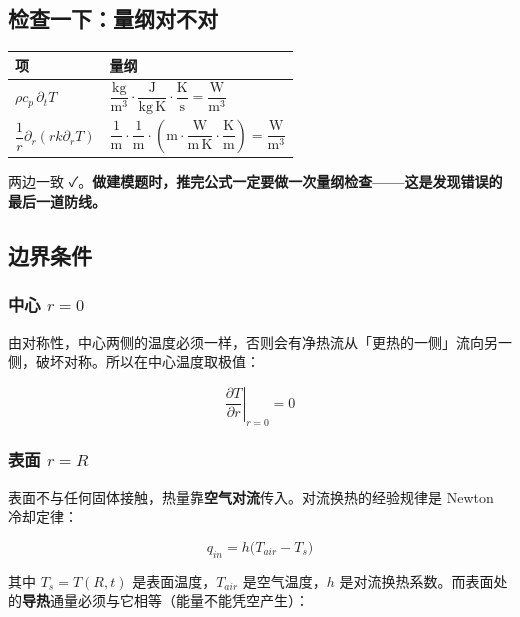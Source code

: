 \subsection{检查一下：量纲对不对}


\begin{center}
\small
\begin{tabular}{ll}
\toprule
项 & 量纲 \\
\midrule
$\rho c_p\,\partial_tT$ & $\dfrac{\mathrm{kg}}{\mathrm{m^3}}\cdot\dfrac{\mathrm J}{\mathrm{kg\,K}}\cdot\dfrac{\mathrm K}{\mathrm s}=\dfrac{\mathrm W}{\mathrm m^3}$ \\
$\dfrac1r\partial_r(rk\partial_rT)$ & $\dfrac1{\mathrm m}\cdot\dfrac1{\mathrm m}\cdot\left(\mathrm m\cdot\dfrac{\mathrm W}{\mathrm{m\,K}}\cdot\dfrac{\mathrm K}{\mathrm m}\right)=\dfrac{\mathrm W}{\mathrm m^3}$ \\
\bottomrule
\end{tabular}
\end{center}


两边一致 ✓。\textbf{做建模题时，推完公式一定要做一次量纲检查——这是发现错误的最后一道防线。}


\subsection{边界条件}


\subsubsection{中心 $r=0$}


由对称性，中心两侧的温度必须一样，否则会有净热流从「更热的一侧」流向另一侧，破坏对称。所以在中心温度取极值：


\begin{equation}
\left.\frac{\partial T}{\partial r}\right|_{r=0}=0\tag{2.2}
\end{equation}


\subsubsection{表面 $r=R$}


表面不与任何固体接触，热量靠\textbf{空气对流}传入。对流换热的经验规律是 Newton 冷却定律：


\begin{equation*}
q_{in}=h\big(T_{air}-T_s\big)
\end{equation*}


其中 $T_s=T(R,t)$ 是表面温度，$T_{air}$ 是空气温度，$h$ 是对流换热系数。而表面处的\textbf{导热}通量必须与它相等（能量不能凭空产生）：


